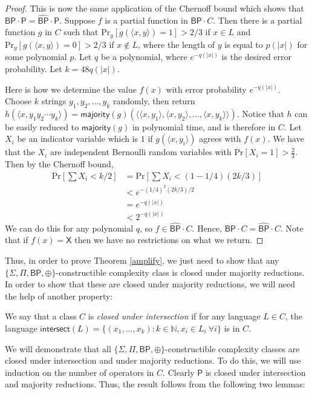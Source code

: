 \documentclass[11pt]{article}
\newcommand{\pr}{\text{Pr}}
\newcommand{\bp}{\textsf{BP}}
\newcommand{\strongbp}{\widehat{\textsf{BP}}}
\newcommand{\parity}{\oplus}
\newcommand{\p}{\textsf{P}}
\newcommand{\x}{\textsf{X}}
\newcommand{\intersection}{\textsf{intersect}}
\newcommand{\majority}{\textsf{majority}}
\begin{document}
\begin{proof}
This is now the same application of the Chernoff bound which shows that $\bp \cdot \p = \strongbp \cdot \p$. Suppose $f$ is a partial function in $\bp \cdot C$. Then there is a partial function $g$ in $C$ such that $\pr_y [g(\langle x,y\rangle) = 1] > 2/3$ if $x\in L$ and $\pr_y [g(\langle x, y\rangle) = 0] > 2/3$ if $x\not\in L$, where the length of $y$ is equal to $p(|x|)$ for some polynomial $p$. Let $q$ be a polynomial, where $e^{-q(|x|)}$ is the desired error probability. Let $k = 48q(|x|)$.

Here is how we determine the value $f(x)$ with error probability $e^{-q(|x|)}$. Choose $k$ strings $y_1,y_2,...,y_k$ randomly, then return $h(\langle x, y_1y_2\cdots y_k\rangle) = \majority(g)(\langle \langle x, y_1 \rangle, \langle x, y_2 \rangle, \ldots, \langle x, y_k \rangle \rangle)$. Notice that $h$ can be easily reduced to $\majority(g)$ in polynomial time, and is therefore in $C$.
Let $X_i$ be an indicator variable which is $1$ if $g(\langle x,y_i\rangle)$ agrees with $f(x)$. We have that the $X_i$ are independent Bernoulli random variables with $\pr\left[X_i = 1\right] > \frac{2}{3}$.  Then by the Chernoff bound,
\begin{align*}
\pr\left[\sum X_i < k/2\right] &= \pr\left[\sum X_i < (1 - 1/4)(2k/3)\right]\\
&< e^{-(1/4)^2 (2k/3) / 2}\\
&= e^{-q(|x|)} \\
&< 2^{-q(|x|)}
\end{align*}
We can do this for any polynomial $q$, so $f \in \strongbp \cdot C$. Hence, $\bp \cdot C = \strongbp \cdot C$. Note that if $f(x) = \x$ then we have no restrictions on what we return.
\end{proof}

Thus, in order to prove Theorem \ref{amplify}, we just need to show that any $\{\Sigma,\Pi,\bp,\parity\}$-constructible complexity class is closed under majority reductions. In order to show that these are closed under majority reductions, we will need the help of another property:
\begin{definition}\label{defintersection}
We say that a class $C$ is \emph{closed under intersection} if for any language $L \in C$, the language $\intersection(L) = \{(x_1,...,x_k) : k\in\mathbb{N}, x_i \in L_i ~ \forall i\}$ is in $C$.
\end{definition}
We will demonstrate that all $\{\Sigma, \Pi, \bp, \parity\}$-constructible complexity classes are closed under intersection and under majority reductions. To do this, we will use induction on the number of operators in $C$. Clearly $\p$ is closed under intersection and majority reductions. Thus, the result follows from the following two lemmas:
\end{document}
